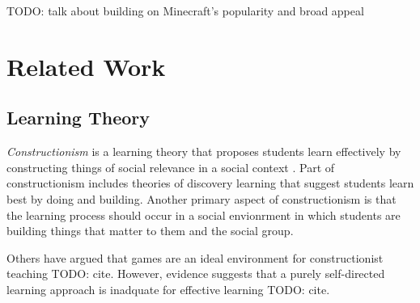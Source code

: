 \documentclass{sig-alternate}
\newcommand{\TODO}[1]{{\color{red} TODO: #1}}
\newcommand{\gametitle}{{\color{RoyalPurple} Dragon Architect Academy}}
\begin{document}
\TODO{talk about building on Minecraft's popularity and broad appeal}





\section{Related Work}

\subsection{Learning Theory}
\label{subsec:learning}
\emph{Constructionism} is a learning theory that proposes students learn effectively by constructing things of social relevance in a social context \cite{kafai06constructionism}.
Part of constructionism includes theories of discovery learning that suggest students learn best by doing and building.
Another primary aspect of constructionism is that the learning process should occur in a social envionrment in which students are building things that matter to them and the social group.

Others have argued that games are an ideal environment for constructionist teaching \TODO{cite}.
However, evidence suggests that a purely self-directed learning approach is inadquate for effective learning \TODO{cite}.
\end{document}
